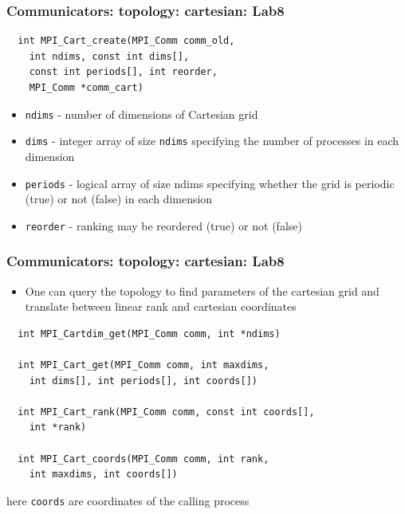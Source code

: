 \documentclass{beamer}
\begin{document}
\begin{frame}[fragile]
  \frametitle{Communicators: topology: cartesian: Lab8}
{\color{mycolorcode}
\begin{verbatim}
  int MPI_Cart_create(MPI_Comm comm_old, 
    int ndims, const int dims[],
    const int periods[], int reorder, 
    MPI_Comm *comm_cart)
\end{verbatim}
}
\begin{itemize}
\item {\color{mycolorcode}\verb|ndims|} - number of dimensions of Cartesian grid
\item {\color{mycolorcode}\verb|dims|} - integer array of size {\color{mycolorcode}\verb|ndims|} specifying the number of
processes in each dimension
\item {\color{mycolorcode}\verb|periods|} - logical array of size ndims specifying whether the grid
is periodic (true) or not (false) in each dimension
\item {\color{mycolorcode}\verb|reorder|} - ranking may be reordered (true) or not (false)
\end{itemize}
\end{frame}

\begin{frame}[fragile]
  \frametitle{Communicators: topology: cartesian: Lab8}
\begin{itemize}
\item One can query the topology to find parameters of the cartesian grid and translate between linear rank and cartesian coordinates
\end{itemize}
{\color{mycolorcode}
\begin{verbatim}
  int MPI_Cartdim_get(MPI_Comm comm, int *ndims)

  int MPI_Cart_get(MPI_Comm comm, int maxdims, 
    int dims[], int periods[], int coords[])

  int MPI_Cart_rank(MPI_Comm comm, const int coords[], 
    int *rank)

  int MPI_Cart_coords(MPI_Comm comm, int rank, 
    int maxdims, int coords[])
\end{verbatim}
}
here {\color{mycolorcode}\verb|coords|} are coordinates of the calling process
\end{frame}
\end{document}
